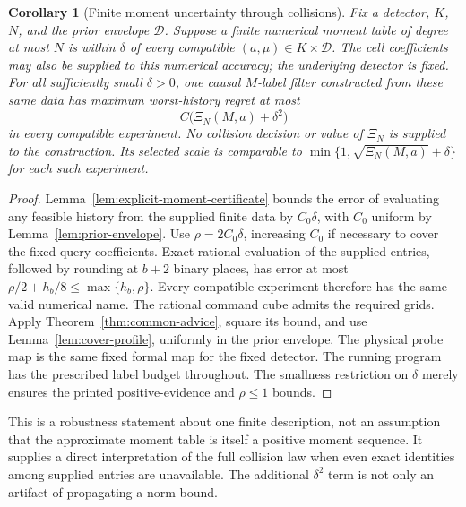 \documentclass[11pt]{amsart}
\newtheorem{corollary}[theorem]{Corollary}
\theoremstyle{definition}\newtheorem{definition}[theorem]{Definition}
\theoremstyle{remark}\newtheorem{remark}[theorem]{Remark}
\begin{document}
\begin{corollary}[Finite moment uncertainty through collisions]
\label{cor:uncertain-monomial}
Fix a detector, $K$, $N$, and the prior envelope $\mathcal D$.
Suppose a finite numerical moment table of degree at most $N$ is within
$\delta$ of every compatible $(a,\mu)\in K\times\mathcal D$.
The cell coefficients may also be supplied to this numerical accuracy;
the underlying detector is fixed. For all sufficiently small $\delta>0$,
one causal $M$-label filter constructed from these same data has
maximum worst-history regret at most
\begin{equation}\label{eq:uncertain-profile}
 C\bigl(\Xi_N(M,a)+\delta^2\bigr)
\end{equation}
in every compatible experiment. No collision decision or value of $\Xi_N$
is supplied to the construction. Its selected scale is comparable to
$\min\{1,\sqrt{\Xi_N(M,a)}+\delta\}$ for each such experiment.
\end{corollary}
\begin{proof}
Lemma~\ref{lem:explicit-moment-certificate} bounds the error of evaluating
any feasible history from the supplied finite data by $C_0\delta$,
with $C_0$ uniform by Lemma~\ref{lem:prior-envelope}. Use
$\rho=2C_0\delta$, increasing $C_0$ if necessary to cover the fixed
query coefficients. Exact rational evaluation of the supplied entries,
followed by rounding at $b+2$ binary places, has error at most
$\rho/2+h_b/8\le\max\{h_b,\rho\}$. Every compatible experiment
therefore has the same valid numerical name. The rational command
cube admits the required grids. Apply Theorem~\ref{thm:common-advice},
square its bound, and use Lemma~\ref{lem:cover-profile}, uniformly in
the prior envelope. The physical probe map is the same fixed formal
map for the fixed detector. The running program has the prescribed
label budget throughout. The smallness restriction on $\delta$ merely
ensures the printed positive-evidence and $\rho\le1$ bounds.
\end{proof}

This is a robustness statement about one finite description, not an
assumption that the approximate moment table is itself a positive
moment sequence. It supplies a direct interpretation of the full
collision law when even exact identities among supplied entries are
unavailable. The additional $\delta^2$ term is not only an artifact of
propagating a norm bound.
\end{document}

